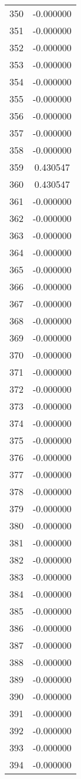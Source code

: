 \documentclass[12pt]{article}
\begin{document}
\begin{longtable}{@{}cc@{}}
350 & -0.000000 \\
351 & -0.000000 \\
352 & -0.000000 \\
353 & -0.000000 \\
354 & -0.000000 \\
355 & -0.000000 \\
356 & -0.000000 \\
357 & -0.000000 \\
358 & -0.000000 \\
359 & 0.430547 \\
360 & 0.430547 \\
361 & -0.000000 \\
362 & -0.000000 \\
363 & -0.000000 \\
364 & -0.000000 \\
365 & -0.000000 \\
366 & -0.000000 \\
367 & -0.000000 \\
368 & -0.000000 \\
369 & -0.000000 \\
370 & -0.000000 \\
371 & -0.000000 \\
372 & -0.000000 \\
373 & -0.000000 \\
374 & -0.000000 \\
375 & -0.000000 \\
376 & -0.000000 \\
377 & -0.000000 \\
378 & -0.000000 \\
379 & -0.000000 \\
380 & -0.000000 \\
381 & -0.000000 \\
382 & -0.000000 \\
383 & -0.000000 \\
384 & -0.000000 \\
385 & -0.000000 \\
386 & -0.000000 \\
387 & -0.000000 \\
388 & -0.000000 \\
389 & -0.000000 \\
390 & -0.000000 \\
391 & -0.000000 \\
392 & -0.000000 \\
393 & -0.000000 \\
394 & -0.000000 \\

\end{longtable}
\end{document}
